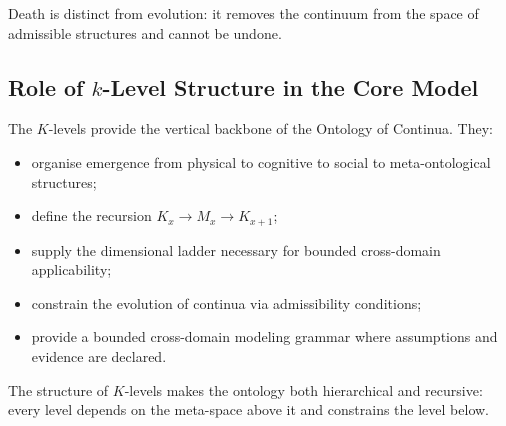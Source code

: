 Death is distinct from evolution: it removes the continuum from the
space of admissible structures and cannot be undone.


\subsection{Role of \texorpdfstring{$k$}{k}-Level Structure in the Core Model}

The $K$-levels provide the vertical backbone of the Ontology of
Continua.  
They:
\begin{itemize}
    \item organise emergence from physical to cognitive to social to
          meta-ontological structures;
    \item define the recursion $K_x \to M_x \to K_{x+1}$;
    \item supply the dimensional ladder necessary for bounded cross-domain applicability;
    \item constrain the evolution of continua via admissibility
          conditions;
    \item provide a bounded cross-domain modeling grammar where assumptions and evidence are declared.
\end{itemize}

The structure of $K$-levels makes the ontology both hierarchical and
recursive: every level depends on the meta-space above it and constrains
the level below.
